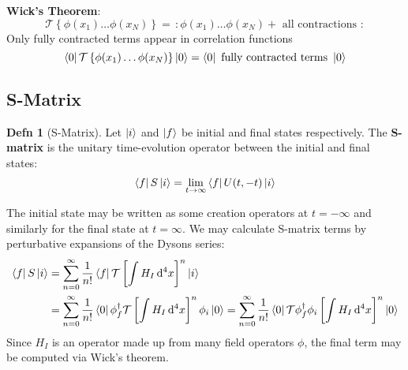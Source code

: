 \documentclass[12pt]{article}
\newcommand{\diff}{\mathop{}\!\mathrm{d}}
\newcommand{\normord}[1]{:\mathrel{#1}:}
\theoremstyle{definition}
\newtheorem{defn}{Defn}[section]
\begin{document}
\textbf{Wick's Theorem}:
\begin{equation*}
    \mathcal{T} \left\{ \phi(x_1) \dots \phi(x_N) \right\} = \, \normord{\phi(x_1) \dots \phi(x_N) + \text{ all contractions }}
\end{equation*}
Only fully contracted terms appear in correlation functions
\begin{equation*}
    \bra{0} \mathcal{T} \left\{ \phi(x_1) \dots \phi(x_N) \right\} \ket{0} = \bra{0} \text{ fully contracted terms } \ket{0}
\end{equation*}

\subsection{S-Matrix}
\begin{defn}[S-Matrix]
    Let $\ket{i}$ and $\ket{f}$ be initial and final states respectively. The \textbf{S-matrix} is the
    unitary time-evolution operator between the initial and final states:
    \begin{equation*}
        \bra{f} S \ket{i} = \lim_{t \to \infty} \bra{f} U(t, -t) \ket{i}
    \end{equation*}
\end{defn}
The initial state may be written as some creation operators at $t = -\infty$ and similarly for the
final state at $t = \infty$. We may calculate S-matrix terms by perturbative expansions of the Dysons series:
\begin{equation*}
\begin{split}
    \bra{f} S \ket{i}
        &= \sum_{n = 0}^\infty \frac{1}{n!} \bra{f} \mathcal{T} \left[ \int H_I \diff^4 x \right]^n \ket{i} \\
        &= \sum_{n = 0}^\infty \frac{1}{n!} \bra{0} \phi^\dagger_{f} \mathcal{T} \left[ \int H_I \diff^4 x \right]^n \phi_i \ket{0}
        = \sum_{n = 0}^\infty \frac{1}{n!} \bra{0} \mathcal{T} \phi^\dagger_{f} \phi_i \left[ \int H_I \diff^4 x \right]^n \ket{0} \\
\end{split}
\end{equation*}
Since $H_I$ is an operator made up from many field operators $\phi$, the final term may be computed via
Wick's theorem.
\end{document}
